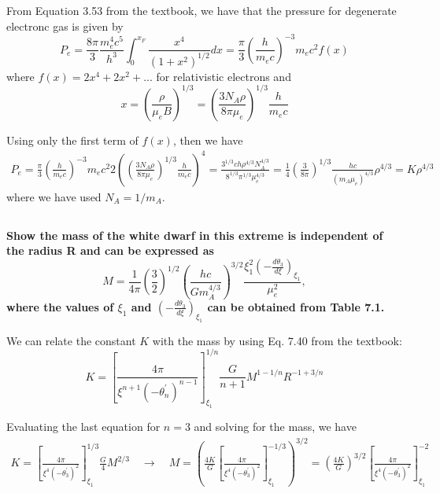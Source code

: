 From Equation 3.53 from the textbook, we have that the pressure for degenerate electronc gas is given by
\begin{equation}
    P_e = \frac{8\pi}{3}\frac{m_e^4c^5}{h^3}\int^{x_F}_0\frac{x^4}{(1+x^2)^{1/2}}dx = \frac{\pi}{3}\left(\frac{h}{m_ec}\right)^{-3}m_ec^2 f(x)
\end{equation}
where $f(x)=2x^4 + 2x^2 + ... $ for relativistic electrons and 
\begin{equation}
    x = \left(\frac{\rho}{\mu_eB}\right)^{1/3} = \left(\frac{3 N_A \rho}{8\pi \mu_e}\right)^{1/3}\frac{h}{m_ec}
\end{equation}

Using only the first term of $f(x)$, then we have 
\begin{align*}
    P_e = \frac{\pi}{3}\left(\frac{h}{m_ec}\right)^{-3}m_ec^2 2\left( \left(\frac{3 N_A \rho}{8\pi \mu_e}\right)^{1/3}\frac{h}{m_ec}\right)^4 = \frac{3^{1/3}ch\rho^{4/3}N_A^{4/3}}{8^{1/3}\pi^{1/3}\mu_e^{4/3}} = \frac{1}{4}\left(\frac{3}{8\pi}\right)^{1/3}\frac{hc}{(m_A\mu_e)^{4/3}}\rho^{4/3} = K \rho^{4/3}
\end{align*}
where we have used $N_A = 1/m_A$. 



\subsection{}
\textbf{Show the mass of the white dwarf in this extreme is independent of the radius
R and can be expressed as
\begin{equation}
    M = \frac{1}{4\pi}\left(\frac{3}{2}\right)^{1/2}\left(\frac{hc}{Gm_A^{4/3}}\right)^{3/2}\frac{\xi_1^2\left(-\frac{d\theta_3}{d\xi}\right)_{\xi_1}}{\mu_e^2},
\end{equation}
where the values of $\xi_1$ and $\left(-\frac{d\theta_3}{d\xi}\right)_{\xi_1}$ can be obtained from Table 7.1.}

We can relate the constant $K$ with the mass by using Eq. 7.40 from the textbook:
\begin{equation}
    K = \left[\frac{4\pi}{\xi^{n+1}(-\theta^\prime_n)^{n-1}}\right]^{1/n}_{\xi_1}\frac{G}{n+1}M^{1-1/n}R^{-1+3/n}
    \label{eq:polytropeK}
\end{equation}

Evaluating the last equation for $n=3$ and solving for the mass, we have
\begin{align*}
    K = \left[\frac{4\pi}{\xi^{4}(-\theta^\prime_3)^{2}}\right]^{1/3}_{\xi_1}\frac{G}{4}M^{2/3} \quad\rightarrow\quad
    M = \left(\frac{4K}{G}\left[\frac{4\pi}{\xi^{4}(-\theta^\prime_3)^{2}}\right]^{-1/3}_{\xi_1}\right)^{3/2} = \left(\frac{4K}{G}\right)^{3/2}\left[\frac{4\pi}{\xi^{4}(-\theta^\prime_3)^{2}}\right]^{-2}_{\xi_1}
\end{align*}

